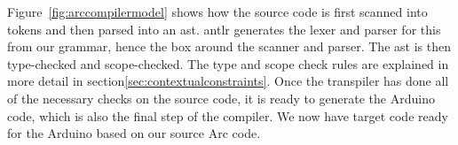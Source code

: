 Figure~\ref{fig:arccompilermodel} shows how the source code is first scanned into tokens and then parsed into an \gls{ast}. \gls{antlr} generates the lexer and parser for this from our grammar, hence the box around the scanner and parser. The \gls{ast} is then type-checked and scope-checked. The type and scope check rules are explained in more detail in section\ref{sec:contextualconstraints}. Once the transpiler has done all of the necessary checks on the source code, it is ready to generate the Arduino code, which is also the final step of the compiler. We now have target code ready for the Arduino based on our source Arc code.